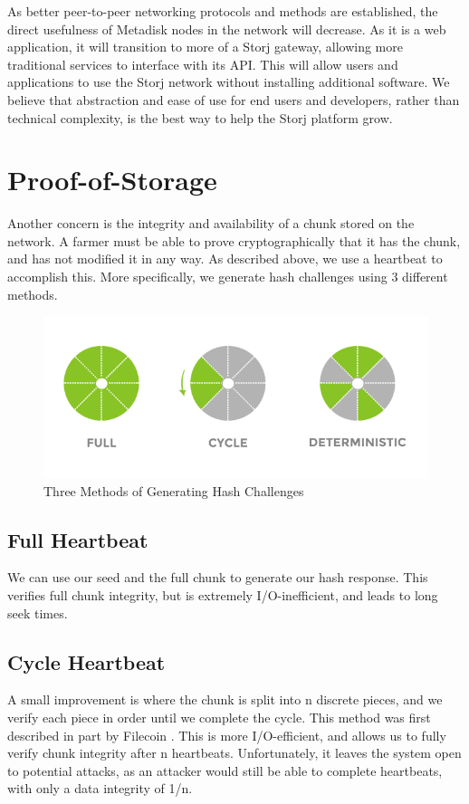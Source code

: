 \documentclass[a4paper,10pt]{article}
\begin{document}
As better peer-to-peer networking protocols and methods are established, the direct usefulness of Metadisk nodes in the network will decrease. As it is a web application, it will transition to more of a Storj gateway, allowing more traditional services to interface with its API. This will allow users and applications to use the Storj network without installing additional software. We believe that abstraction and ease of use for end users and developers, rather than technical complexity, is the best way to help the Storj platform grow. \\

\section{Proof-of-Storage}
Another concern is the integrity and availability of a chunk stored on the network. A farmer must be able to prove cryptographically that it has the chunk, and has not modified it in any way. As described above, we use a heartbeat to accomplish this. More specifically, we generate hash challenges using 3 different methods.  \\

\begin{figure}[h!]
\centering
\includegraphics[width=\linewidth]{8}
\caption{Three Methods of Generating Hash Challenges}
\end{figure}

\subsection{Full Heartbeat}
We can use our seed and the full chunk to generate our hash response. This verifies full chunk integrity, but is extremely I/O-inefficient, and leads to long seek times.
\subsection{Cycle Heartbeat}
A small improvement is where the chunk is split into n discrete pieces, and we verify each piece in order until we complete the cycle. This method was first described in part by Filecoin \cite{11}. This is more I/O-efficient, and allows us to fully verify chunk integrity after n heartbeats. Unfortunately, it leaves the system open to potential attacks, as an attacker would still be able to complete heartbeats, with only a data integrity of 1/n.
\end{document}
